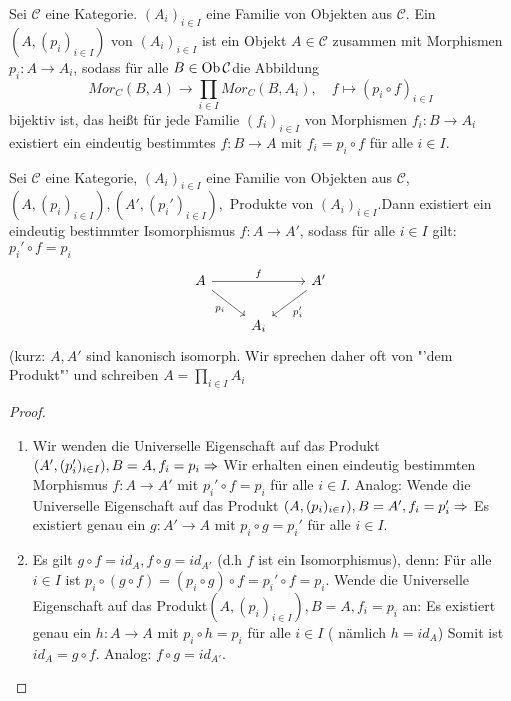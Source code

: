 \begin{df}\label{5.4}
	Sei $\mathcal{C}$ eine Kategorie. $(A_i)_{i \in I} $ eine Familie von Objekten aus $\mathcal{C}$. Ein  $(A, (p_i)_{i \in I})$ von $(A_i)_{i \in I}$ ist ein Objekt $A\in \mathcal{C} $ zusammen mit Morphismen $p_i:A \to A_i $, sodass für alle $B \in \text{Ob}\,\mathcal{C} $die Abbildung $$ Mor_C(B,A) \to \prod_{i \in I} Mor_C(B,A_i) , \quad f \mapsto (p_i \circ f) _{i \in I} $$ bijektiv ist, das heißt für jede Familie $(f_i)_{i \in I}$ von Morphismen $f_i: B \to A_i $ existiert ein eindeutig bestimmtes $f:B \to A $ mit $ f_i = p_i \circ f $ für alle $ i \in I$.
\end{df}
\begin{bem}\label{bem}
	Sei $\mathcal{C}$ eine Kategorie, $(A_i)_{i \in I}$ eine Familie von Objekten aus $\mathcal{C}$, $(A, (p_i)_{i \in I}), (A', (p_i')_{i \in I}),$ Produkte von $(A_i)_{i \in I}. $Dann existiert ein eindeutig bestimmter Isomorphismus $ f:A \to A' $, sodass für alle $i \in I $ gilt: $p_i' \circ f = p_i$
	$$\begin{tikzcd}
	A \arrow{rr}{f} \arrow[swap]{dr}{p_i} & & A' \arrow{dl}{p_i'	}\\
	&A_i& 
	\end{tikzcd}$$
	(kurz: $A,A'$ sind kanonisch isomorph. Wir sprechen daher oft von "'dem Produkt"' und schreiben $ A = \prod_{i \in I} A_i $
\end{bem}
\begin{proof}
	\begin{enumerate} 
		\item Wir wenden die Universelle Eigenschaft auf das Produkt $(A', (p_i')_{i \in I}), B = A, f_i = p_i \Rightarrow $ Wir erhalten einen eindeutig bestimmten Morphismus $ f: A \to A' $ mit $ p_i' \circ f = p_i $ für alle $ i \in I$. Analog: Wende die Universelle Eigenschaft auf das Produkt $(A, (p_i)_{i \in I}), B = A', f_i= p_i' \Rightarrow $ Es existiert genau ein $ g: A' \to A $ mit $p_i \circ g = p_i'$ für alle $i \in I $.
		\item Es gilt $ g \circ f = id_A, f \circ g = id_{A'} $ (d.h $f$ ist ein Isomorphismus), denn: Für alle $ i \in I $ ist $p_i \circ ( g \circ f ) = ( p_i \circ g) \circ f =  p_i' \circ f = p_i $. Wende die Universelle Eigenschaft auf das Produkt$ (A, (p_i)_{i \in I}), B= A, f_i = p_i $ an:
		Es existiert genau ein $ h: A \to A $ mit $ p_i \circ h = p_i $ für alle $ i \in I $ ( nämlich $ h = id_A $) Somit ist $ id_A = g \circ f.$ Analog:  $ f \circ g = id_{A'}$.
	\end{enumerate}
\end{proof}
